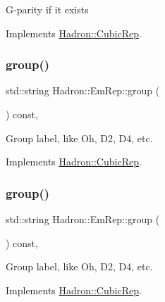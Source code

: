 G-\/parity if it exists 

Implements \mbox{\hyperlink{structHadron_1_1CubicRep_a52104e43266d1614c00bbd1c3b395458}{Hadron\+::\+Cubic\+Rep}}.

\mbox{\label{structHadron_1_1EmRep_adc28161832b89ed8222fcc7ce5928781}} 
\subsubsection{\texorpdfstring{group()}{group()}\hspace{0.1cm}{\footnotesize\ttfamily [1/2]}}
{\footnotesize\ttfamily std\+::string Hadron\+::\+Em\+Rep\+::group (\begin{DoxyParamCaption}{ }\end{DoxyParamCaption}) const\hspace{0.3cm}{\ttfamily [inline]}, {\ttfamily [virtual]}}

Group label, like Oh, D2, D4, etc. 

Implements \mbox{\hyperlink{structHadron_1_1CubicRep_a0748f11ec87f387062c8e8981339a29c}{Hadron\+::\+Cubic\+Rep}}.

\mbox{\label{structHadron_1_1EmRep_adc28161832b89ed8222fcc7ce5928781}} 
\subsubsection{\texorpdfstring{group()}{group()}\hspace{0.1cm}{\footnotesize\ttfamily [2/2]}}
{\footnotesize\ttfamily std\+::string Hadron\+::\+Em\+Rep\+::group (\begin{DoxyParamCaption}{ }\end{DoxyParamCaption}) const\hspace{0.3cm}{\ttfamily [inline]}, {\ttfamily [virtual]}}

Group label, like Oh, D2, D4, etc. 

Implements \mbox{\hyperlink{structHadron_1_1CubicRep_a0748f11ec87f387062c8e8981339a29c}{Hadron\+::\+Cubic\+Rep}}.

\mbox{\label{structHadron_1_1EmRep_ab85c0592fa268cf31b803c3a128bbfa5}} 
